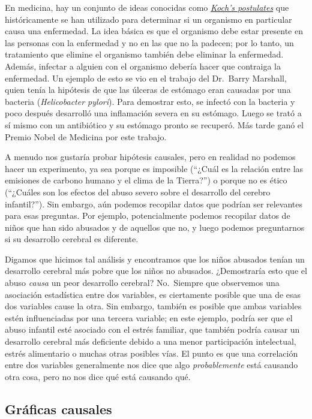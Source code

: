 \documentclass[
  12pt,
]{book}
\begin{document}
En medicina, hay un conjunto de ideas conocidas como \href{https://en.wikipedia.org/wiki/Koch\%27s_postulates}{\emph{Koch's postulates}} que históricamente se han utilizado para determinar si un organismo en particular causa una enfermedad. La idea básica es que el organismo debe estar presente en las personas con la enfermedad y no en las que no la padecen; por lo tanto, un tratamiento que elimine el organismo también debe eliminar la enfermedad. Además, infectar a alguien con el organismo debería hacer que contraiga la enfermedad. Un ejemplo de esto se vio en el trabajo del Dr.~Barry Marshall, quien tenía la hipótesis de que las úlceras de estómago eran causadas por una bacteria (\emph{Helicobacter pylori}). Para demostrar esto, se infectó con la bacteria y poco después desarrolló una inflamación severa en su estómago. Luego se trató a sí mismo con un antibiótico y su estómago pronto se recuperó. Más tarde ganó el Premio Nobel de Medicina por este trabajo.

A menudo nos gustaría probar hipótesis causales, pero en realidad no podemos hacer un experimento, ya sea porque es imposible (``¿Cuál es la relación entre las emisiones de carbono humano y el clima de la Tierra?'') o porque no es ético (``¿Cuáles son los efectos del abuso severo sobre el desarrollo del cerebro infantil?''). Sin embargo, aún podemos recopilar datos que podrían ser relevantes para esas preguntas. Por ejemplo, potencialmente podemos recopilar datos de niños que han sido abusados y de aquellos que no, y luego podemos preguntarnos si su desarrollo cerebral es diferente.

Digamos que hicimos tal análisis y encontramos que los niños abusados tenían un desarrollo cerebral más pobre que los niños no abusados. ¿Demostraría esto que el abuso \emph{causa} un peor desarrollo cerebral? No.~Siempre que observemos una asociación estadística entre dos variables, es ciertamente posible que una de esas dos variables cause la otra. Sin embargo, también es posible que ambas variables estén influenciadas por una tercera variable; en este ejemplo, podría ser que el abuso infantil esté asociado con el estrés familiar, que también podría causar un desarrollo cerebral más deficiente debido a una menor participación intelectual, estrés alimentario o muchas otras posibles vías. El punto es que una correlación entre dos variables generalmente nos dice que algo \emph{probablemente} está causando otra cosa, pero no nos dice qué está causando qué.

\hypertarget{gruxe1ficas-causales}{%
\subsection{Gráficas causales}\label{gruxe1ficas-causales}}
\end{document}
